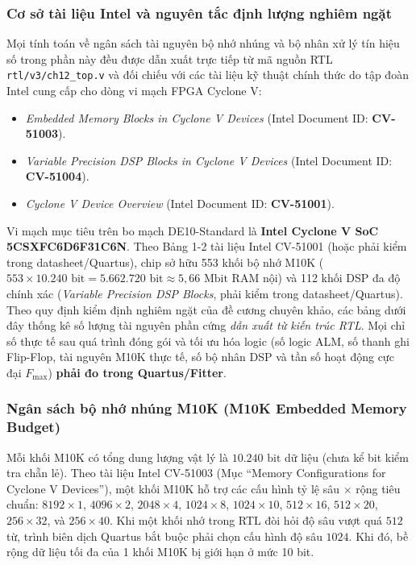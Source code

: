 \subsubsection*{Cơ sở tài liệu Intel và nguyên tắc định lượng nghiêm ngặt}
Mọi tính toán về ngân sách tài nguyên bộ nhớ nhúng và bộ nhân xử lý tín hiệu số trong phần này đều được dẫn xuất trực tiếp từ mã nguồn RTL \texttt{rtl/v3/ch12\_top.v} và đối chiếu với các tài liệu kỹ thuật chính thức do tập đoàn Intel cung cấp cho dòng vi mạch FPGA Cyclone V:
\begin{itemize}
    \item \emph{Embedded Memory Blocks in Cyclone V Devices} (Intel Document ID: \textbf{CV-51003}).
    \item \emph{Variable Precision DSP Blocks in Cyclone V Devices} (Intel Document ID: \textbf{CV-51004}).
    \item \emph{Cyclone V Device Overview} (Intel Document ID: \textbf{CV-51001}).
\end{itemize}

Vi mạch mục tiêu trên bo mạch DE10-Standard là \textbf{Intel Cyclone V SoC 5CSXFC6D6F31C6N}. Theo Bảng 1-2 tài liệu Intel CV-51001 (hoặc phải kiểm trong datasheet/Quartus), chip sở hữu 553 khối bộ nhớ M10K ($553 \times 10.240\text{ bit} = 5.662.720\text{ bit} \approx 5{,}66\text{ Mbit}$ RAM nội) và 112 khối DSP đa độ chính xác (\emph{Variable Precision DSP Blocks}, phải kiểm trong datasheet/Quartus).
Theo quy định kiểm định nghiêm ngặt của đề cương chuyên khảo, các bảng dưới đây thống kê số lượng tài nguyên phần cứng \emph{dẫn xuất từ kiến trúc RTL}. Mọi chỉ số thực tế sau quá trình đóng gói và tối ưu hóa logic (số logic ALM, số thanh ghi Flip-Flop, tài nguyên M10K thực tế, số bộ nhân DSP và tần số hoạt động cực đại $F_{\max}$) \textbf{phải đo trong Quartus/Fitter}.

\subsubsection*{Ngân sách bộ nhớ nhúng M10K (M10K Embedded Memory Budget)}
Mỗi khối M10K có tổng dung lượng vật lý là $10.240\text{ bit}$ dữ liệu (chưa kể bit kiểm tra chẵn lẻ). Theo tài liệu Intel CV-51003 (Mục ``Memory Configurations for Cyclone V Devices''), một khối M10K hỗ trợ các cấu hình tỷ lệ sâu $\times$ rộng tiêu chuẩn:
$8192 \times 1$, $4096 \times 2$, $2048 \times 4$, $1024 \times 8$, $1024 \times 10$, $512 \times 16$, $512 \times 20$, $256 \times 32$, và $256 \times 40$.
Khi một khối nhớ trong RTL đòi hỏi độ sâu vượt quá $512$ từ, trình biên dịch Quartus bắt buộc phải chọn cấu hình độ sâu $1024$. Khi đó, bề rộng dữ liệu tối đa của 1 khối M10K bị giới hạn ở mức 10 bit.

